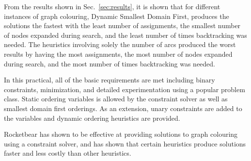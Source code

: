 \documentclass{article}
\begin{document}
From the results shown in Sec.~\ref{sec:results}, it is shown that for
different instances of graph colouring, Dynamic Smallest Domain First, produces
the solutions the fastest with the least number of assignments, the smallest
number of nodes expanded during search, and the least number of times
backtracking was needed. The heuristics involving solely the number of arcs
produced the worst results by having the most assignments, the most number of
nodes expanded during search, and the most number of times backtracking was
needed.

In this practical, all of the basic requirements are met including binary
constraints, minimization, and detailed experimentation using a popular problem
class. Static ordering variables is allowed by the constraint solver as well as
smallest domain first orderings. As an extension, unary constraints are added
to the variables and dynamic ordering heuristics are provided.

Rocketbear has shown to be effective at providing solutions to graph colouring
using a constraint solver, and has shown that certain heuristics produce
solutions faster and less costly than other heuristics.
\end{document}

